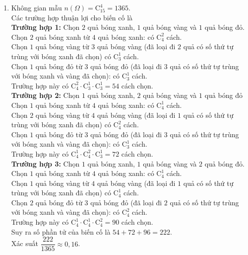 \begin{bt}
{\begin{enumerate}
\begin{itemize}
				Vậy số cách lấy ra là $180+240+300=520$ cách.
			\end{itemize}
			\item Không gian mẫu $n(\Omega)=\mathrm{C}_{15}^4=1365$.\\
			Các trường hợp thuận lợi cho biến cố là\\
			\textbf{Trường hợp 1:} Chọn $2$ quả bóng xanh, $1$ quả bóng vàng và $1$ quả bóng đỏ.\\
			Chọn $2$ quả bóng xanh từ $4$ quả bóng xanh: có $\mathrm{C}_4^2$ cách.\\
			Chọn $1$ quả bóng vàng từ $3$ quả bóng vàng (đã loại đi $2$ quả có số thứ tự trùng với bóng xanh đã chọn) có $\mathrm{C}_3^1$ cách.\\
			Chọn $1$ quả bóng đỏ từ $3$ quả bóng đỏ (đã loại đi $3$ quả có số thứ tự trùng với bóng xanh và vàng đã chọn): có $\mathrm{C}_3^1$ cách.\\
			Trường hợp này có $\mathrm{C}_4^2\cdot \mathrm{C}_3^1\cdot \mathrm{C}_3^1=54$ cách chọn.\\
			\textbf{Trường hợp 2:} Chọn $1$ quả bóng xanh, $2$ quả bóng vàng và $1$ quả bóng đỏ\\
			Chọn $1$ quả bóng xanh từ $4$ quả bóng xanh: có $\mathrm{C}_4^1$ cách.\\
			Chọn $2$ quả bóng vàng từ $4$ quả bóng vàng (đã loại đi $1$ quả có số thứ tự trùng với bóng xanh đã chọn) có $\mathrm{C}_4^2$ cách.\\
			Chọn $1$ quả bóng đỏ từ $3$ quả bóng đỏ (đã loại đi $3$ quả có số thứ tự trùng với bóng xanh và vàng đã chọn): có $\mathrm{C}_3^1$ cách.\\
			Trường hợp này có $\mathrm{C}_4^1\cdot \mathrm{C}_4^2\cdot \mathrm{C}_3^1=72$ cách chọn.\\
			\textbf{Trường hợp 3:} Chọn $1$ quả bóng xanh, $1$ quả bóng vàng và $2$ quả bóng đỏ.\\
			Chọn $1$ quả bóng xanh từ $4$ quả bóng xanh: có $\mathrm{C}_4^1$ cách.\\
			Chọn $1$ quả bóng vàng từ $4$ quả bóng vàng (đã loại đi $1$ quả có số thứ tự trùng với bóng xanh đã chọn) có $\mathrm{C}_4^1$ cách.\\
			Chọn $2$ quả bóng đỏ từ $3$ quả bóng đỏ (đã loại đi $2$ quả có số thứ tự trùng với bóng xanh và vàng đã chọn): có $\mathrm{C}_4^2$ cách.\\
			Trường hợp này có $\mathrm{C}_4^1\cdot \mathrm{C}_4^1\cdot \mathrm{C}_4^2=90$ cách chọn.\\
			Suy ra số phần tử của biến cố là $54+72+96=222$.\\
			Xác suất $\dfrac{222}{1365}\approx 0{,}16$.
		\end{enumerate}
	}
\end{bt}

